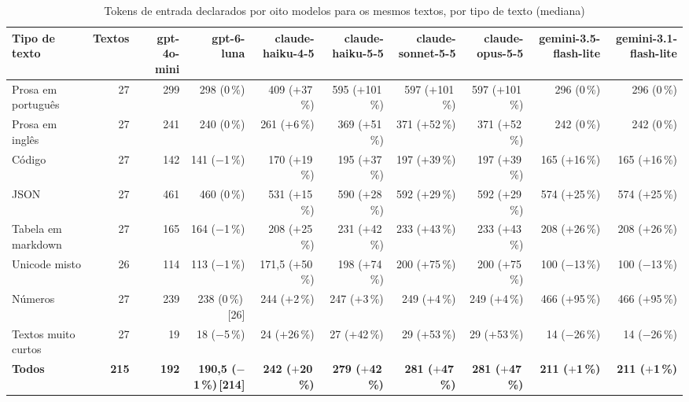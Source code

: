 \begin{table}[htbp]
\centering
\caption{Tokens de entrada declarados por oito modelos para os mesmos textos, por tipo de texto (mediana)}
\label{tab:dif-oito-modelos-familia}
\scriptsize
\begin{tabular}{@{}lrrrrrrrrr@{}}
\toprule
Tipo de texto & Textos & gpt-4o-mini & gpt-6-luna & claude-haiku-4-5 & claude-haiku-5-5 & claude-sonnet-5-5 & claude-opus-5-5 & gemini-3.5-flash-lite & gemini-3.1-flash-lite \\
\midrule
Prosa em português & 27 & 299 & 298 (0\,\%) & 409 ($+$37\,\%) & 595 ($+$101\,\%) & 597 ($+$101\,\%) & 597 ($+$101\,\%) & 296 (0\,\%) & 296 (0\,\%) \\
Prosa em inglês & 27 & 241 & 240 (0\,\%) & 261 ($+$6\,\%) & 369 ($+$51\,\%) & 371 ($+$52\,\%) & 371 ($+$52\,\%) & 242 (0\,\%) & 242 (0\,\%) \\
Código & 27 & 142 & 141 ($-$1\,\%) & 170 ($+$19\,\%) & 195 ($+$37\,\%) & 197 ($+$39\,\%) & 197 ($+$39\,\%) & 165 ($+$16\,\%) & 165 ($+$16\,\%) \\
JSON & 27 & 461 & 460 (0\,\%) & 531 ($+$15\,\%) & 590 ($+$28\,\%) & 592 ($+$29\,\%) & 592 ($+$29\,\%) & 574 ($+$25\,\%) & 574 ($+$25\,\%) \\
Tabela em markdown & 27 & 165 & 164 ($-$1\,\%) & 208 ($+$25\,\%) & 231 ($+$42\,\%) & 233 ($+$43\,\%) & 233 ($+$43\,\%) & 208 ($+$26\,\%) & 208 ($+$26\,\%) \\
Unicode misto & 26 & 114 & 113 ($-$1\,\%) & 171{,}5 ($+$50\,\%) & 198 ($+$74\,\%) & 200 ($+$75\,\%) & 200 ($+$75\,\%) & 100 ($-$13\,\%) & 100 ($-$13\,\%) \\
Números & 27 & 239 & 238 (0\,\%)\,[26] & 244 ($+$2\,\%) & 247 ($+$3\,\%) & 249 ($+$4\,\%) & 249 ($+$4\,\%) & 466 ($+$95\,\%) & 466 ($+$95\,\%) \\
Textos muito curtos & 27 & 19 & 18 ($-$5\,\%) & 24 ($+$26\,\%) & 27 ($+$42\,\%) & 29 ($+$53\,\%) & 29 ($+$53\,\%) & 14 ($-$26\,\%) & 14 ($-$26\,\%) \\
\midrule
\textbf{Todos} & \textbf{215} & \textbf{192} & \textbf{190{,}5 ($-$1\,\%)\,[214]} & \textbf{242 ($+$20\,\%)} & \textbf{279 ($+$42\,\%)} & \textbf{281 ($+$47\,\%)} & \textbf{281 ($+$47\,\%)} & \textbf{211 ($+$1\,\%)} & \textbf{211 ($+$1\,\%)} \\
\bottomrule
\end{tabular}
\end{table}
